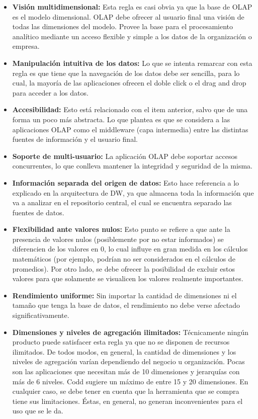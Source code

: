 \documentclass[a4paper,11pt]{article}
\begin{document}
    \begin{itemize}
      \item \textbf{Visión multidimensional:} Esta regla es casi obvia ya que la base de OLAP es el modelo dimensional. OLAP debe ofrecer al usuario final
      una visión de todas las dimensiones del modelo. Provee la base para el procesamiento analítico mediante un acceso flexible y simple a los datos de la 
      organización o empresa.
      \item \textbf{Manipulación intuitiva de los datos:} Lo que se intenta remarcar con esta regla es que tiene que la navegación de los datos debe ser
      sencilla, para lo cual, la mayoría de las aplicaciones ofrecen el doble click o el drag and drop para acceder a los datos.
      \item \textbf{Accesibilidad:} Esto está relacionado con el item anterior, salvo que de una forma un poco más abstracta. Lo que plantea es que se
      considera a las aplicaciones OLAP como el middleware (capa intermedia) entre las distintas fuentes de información y el usuario final.
      \item \textbf{Soporte de multi-usuario:} La aplicación OLAP debe soportar accesos concurrentes, lo que conlleva mantener la integridad y seguridad
      de la misma.
      \item \textbf{Información separada del origen de datos:} Esto hace referencia a lo explicado en la arquitectura de DW, ya que almacena toda la
      información que va a analizar en el repositorio central, el cual se encuentra separado las fuentes de datos.
      \item \textbf{Flexibilidad ante valores nulos:} Esto punto se refiere a que ante la presencia de valores nulos (posiblemente por no estar informados)
      se diferencien de los valores en 0, lo cual influye en gran medida en los cálculos matemáticos (por ejemplo, podrían no ser considerados en el cálculos
      de promedios). Por otro lado, se debe ofrecer la posibilidad de excluir estos valores para que solamente se visualicen los valores realmente
      importantes.
      \item \textbf{Rendimiento uniforme:} Sin importar la cantidad de dimensiones ni el tamaño que tenga la base de datos, el rendimiento no debe verse
      afectado significativamente.
      \item \textbf{Dimensiones y niveles de agregación ilimitados:} Técnicamente ningún producto puede satisfacer esta regla ya que no se disponen de
      recursos ilimitados. De todos modos, en general, la cantidad de dimensiones y los niveles de agregación varían dependiendo del negocio u organización.
      Pocas son las aplicaciones que necesitan más de 10 dimensiones y jerarquías con más de 6 niveles. Codd sugiere un máximo de entre 15 y 20 dimensiones.
      En cualquier caso, se debe tener en cuenta que la herramienta que se compra tiene sus limitaciones. Éstas, en general, no generan inconvenientes para
      el uso que se le da.
    \end{itemize}
    
\end{document}
